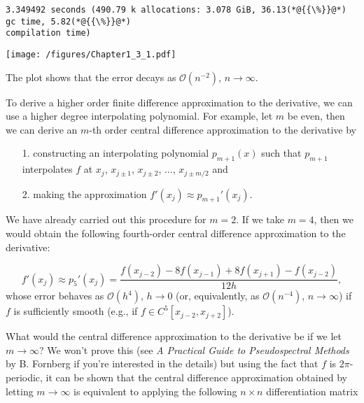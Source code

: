 \documentclass[12pt,a4paper]{article}
\begin{document}
\begin{lstlisting}
3.349492 seconds (490.79 k allocations: 3.078 GiB, 36.13(*@{{\%}}@*) gc time, 5.82(*@{{\%}}@*) 
compilation time)
\end{lstlisting}

\texttt{[image: /figures/Chapter1\_3\_1.pdf]}

The plot shows that the error decays as $\mathcal{O}(n^{-2})$, $n \to \infty$.

To derive a higher order finite difference approximation to the derivative, we can use a higher degree interpolating polynomial.  For example, let $m$ be even, then we can derive an $m$-th order central difference approximation to the derivative by 

\begin{itemize}
\item[1. ] constructing an interpolating polynomial $p_{m+1}(x)$ such that $p_{m+1}$ interpolates $f$ at $x_j$, $x_{j\pm 1}$, $x_{j\pm 2}$, $\ldots$,  $x_{j\pm m/2}$ and 


\item[2. ] making the approximation $f'(x_j) \approx p_{m+1}'(x_j)$. 

\end{itemize}
We have already carried out this procedure for $m = 2$. If we take $m = 4$, then we would obtain the following fourth-order central difference approximation to the derivative:

\[
f'(x_j) \approx p_5'(x_j) = \frac{f(x_{j-2}) -8 f(x_{j-1}) + 8 f(x_{j+1}) - f(x_{j-2})}{12h},
\]
whose error behaves as $\mathcal{O}(h^4)$, $h \to 0$ (or, equivalently, as $\mathcal{O}(n^{-4})$, $n \to \infty$) if $f$ is sufficiently smooth (e.g., if $f \in C^5[x_{j-2}, x_{j+2}]$).

What would the central difference approximation to the derivative be if we let $m \to \infty$? We won't prove this (see \emph{A Practical Guide to Pseudospectral Methods} by B. Fornberg if you're interested in the details) but using the fact that $f$ is $2\pi$-periodic, it can be shown that the central difference approximation obtained by letting $m \to \infty$ is equivalent to applying the following $n \times n$ differentiation matrix
\end{document}
